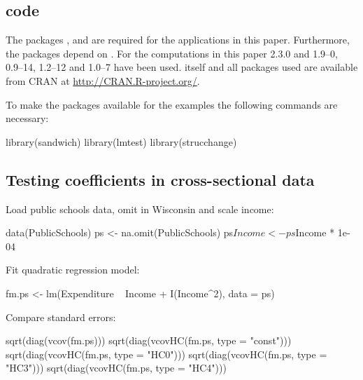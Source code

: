 \documentclass{Z}
\begin{document}
\begin{appendix}


\section[R code]{ code}

The packages ,  and  are
required for the applications in this paper. Furthermore, the packages
depend on . For the computations in this paper 
2.3.0 and 
1.9--0,
 0.9--14,
 1.2--12
and  1.0--7
have been used.  itself and all packages used are available from
CRAN at \url{http://CRAN.R-project.org/}.

To make the packages available for the examples the following commands are 
necessary:
\begin{Schunk}
\begin{Sinput}
  library(sandwich)
  library(lmtest)
  library(strucchange)
\end{Sinput}
\end{Schunk}

\subsection{Testing coefficients in cross-sectional data}

Load public schools data,
omit  in Wisconsin and scale income:
\begin{Schunk}
\begin{Sinput}
  data(PublicSchools)
  ps <- na.omit(PublicSchools)
  ps$Income <- ps$Income * 1e-04
\end{Sinput}
\end{Schunk}

Fit quadratic regression model:
\begin{Schunk}
\begin{Sinput}
  fm.ps <- lm(Expenditure ~ Income + I(Income^2), data = ps)
\end{Sinput}
\end{Schunk}

Compare standard errors:
\begin{Schunk}
\begin{Sinput}
  sqrt(diag(vcov(fm.ps)))
  sqrt(diag(vcovHC(fm.ps, type = "const")))
  sqrt(diag(vcovHC(fm.ps, type = "HC0")))
  sqrt(diag(vcovHC(fm.ps, type = "HC3")))
  sqrt(diag(vcovHC(fm.ps, type = "HC4")))
\end{Sinput}
\end{Schunk}


\end{appendix}
\end{document}
